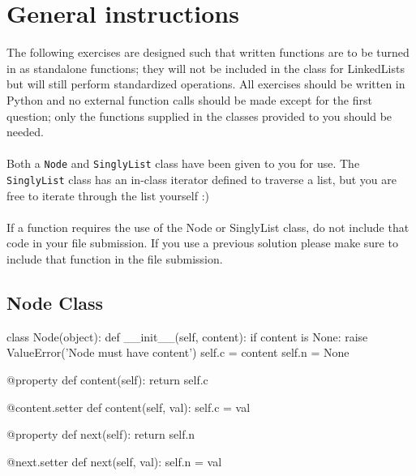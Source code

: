 \documentclass{42-en}
\begin{document}
\chapter{General instructions}
    The following exercises are designed such that written functions are
    to be turned in as standalone functions; they will not be included
    in the class for LinkedLists but will still perform standardized
    operations. All exercises should be written in Python and no external
    function calls should be made except for the first question; only the
    functions supplied in the classes provided to you should be needed.\\
    \\
    Both a \texttt{Node} and \texttt{SinglyList} class have been given to
    you for use. The \texttt{SinglyList} class has an in-class iterator defined to
    traverse a list, but you are free to iterate through the list yourself :)\\
    \\
    If a function requires the use of the Node or SinglyList class, do not 
    include that code in your file submission. If you use a previous solution
    please make sure to include that function in the file submission.

\newpage
    \section{Node Class}

        \begin{42pycode}
class Node(object):
    def __init__(self, content):
        if content is None:
            raise ValueError('Node must have content')
        self.c = content
        self.n = None
    
    @property
    def content(self):
        return self.c

    @content.setter
    def content(self, val):
        self.c = val
    
    @property
    def next(self):
        return self.n
    
    @next.setter
    def next(self, val):
        self.n = val
\end{42pycode}
\end{document}
